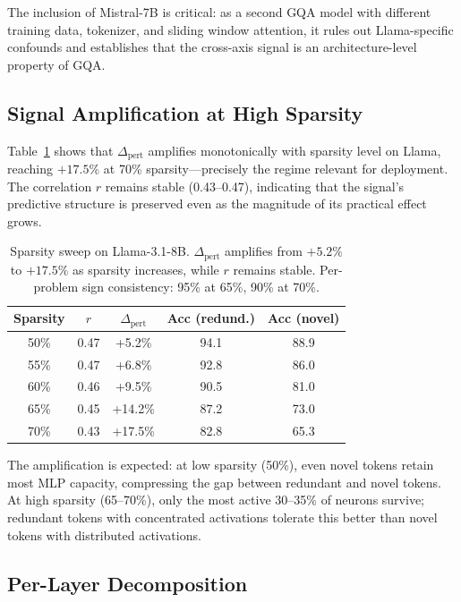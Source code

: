 \documentclass[11pt,a4paper]{article}
\begin{document}
The inclusion of Mistral-7B is critical: as a second GQA model with different training data, tokenizer, and sliding window attention, it rules out Llama-specific confounds and establishes that the cross-axis signal is an architecture-level property of GQA.

\subsection{Signal Amplification at High Sparsity}
\label{sec:sparsity-sweep}

Table~\ref{tab:sparsity-sweep} shows that $\Delta_\text{pert}$ amplifies monotonically with sparsity level on Llama, reaching $+17.5\%$ at 70\% sparsity---precisely the regime relevant for deployment.
The correlation $r$ remains stable (0.43--0.47), indicating that the signal's predictive structure is preserved even as the magnitude of its practical effect grows.

\begin{table}[t]
\centering
\small
\begin{tabular}{ccccc}
\toprule
\textbf{Sparsity} & \textbf{$r$} & \textbf{$\Delta_\text{pert}$} & \textbf{Acc (redund.)} & \textbf{Acc (novel)} \\
\midrule
50\% & 0.47 & +5.2\% & 94.1 & 88.9 \\
55\% & 0.47 & +6.8\% & 92.8 & 86.0 \\
60\% & 0.46 & +9.5\% & 90.5 & 81.0 \\
65\% & 0.45 & +14.2\% & 87.2 & 73.0 \\
70\% & 0.43 & +17.5\% & 82.8 & 65.3 \\
\bottomrule
\end{tabular}
\caption{Sparsity sweep on Llama-3.1-8B. $\Delta_\text{pert}$ amplifies from $+5.2\%$ to $+17.5\%$ as sparsity increases, while $r$ remains stable. Per-problem sign consistency: 95\% at 65\%, 90\% at 70\%.}
\label{tab:sparsity-sweep}
\end{table}

The amplification is expected: at low sparsity (50\%), even novel tokens retain most MLP capacity, compressing the gap between redundant and novel tokens.
At high sparsity (65--70\%), only the most active 30--35\% of neurons survive; redundant tokens with concentrated activations tolerate this better than novel tokens with distributed activations.

\subsection{Per-Layer Decomposition}
\label{sec:per-layer}
\end{document}
